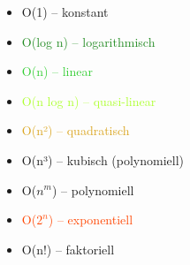 
\begin{itemize}
    \item \textcolor{OliveGreen}{O(1) – konstant}
    \item \textcolor{ForestGreen}{O(log n) – logarithmisch}
    \item \textcolor{LimeGreen}{O(n) – linear}
    \item \textcolor{GreenYellow}{O(n log n) – quasi-linear}
    \item \textcolor{Goldenrod}{O(n²) – quadratisch}
    \item \textcolor{YellowOrange}{O(n³) – kubisch (polynomiell)}
    \item \textcolor{RedOrange}{O($n^m$) – polynomiell}
    \item \textcolor{OrangeRed}{O($2^n$) – exponentiell}
    \item \textcolor{BrickRed}{O(n!) – faktoriell}
\end{itemize}


\newcommand{\linear}[0]{\textcolor{LimeGreen}{linear }}
\newcommand{\quadrat}[0]{\textcolor{Goldenrod}{quadratisch }}
\newcommand{\polynom}[0]{\textcolor{RedOrange}{polynomiell }}
\newcommand{\kubisch}[0]{\textcolor{YellowOrange}{kubisch }}





